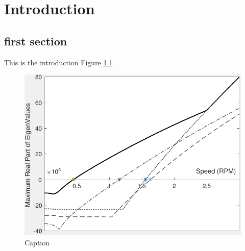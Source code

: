\chapter{Introduction}
\section{first section}
This is the introduction Figure \ref{fig:my_label}\\
\begin{figure}
    \centering
    \includegraphics[width=\linewidth]{figures/StabilityMargin.pdf}
    \caption{Caption}
    \label{fig:my_label}
\end{figure}